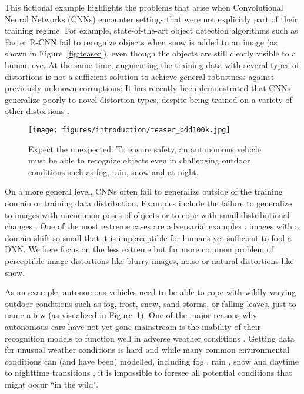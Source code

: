 \documentclass{article}
\begin{document}
\noindent
This fictional example highlights the problems that arise when Convolutional Neural Networks (CNNs) encounter settings that were not explicitly part of their training regime. For example, state-of-the-art object detection algorithms such as Faster R-CNN \citep{Ren2015} fail to recognize objects when snow is added to an image (as shown in Figure~\ref{fig:teaser}), even though the objects are still clearly visible to a human eye. At the same time, augmenting the training data with several types of distortions is not a sufficient solution to achieve general robustness against previously unknown corruptions: It has recently been demonstrated that CNNs generalize poorly to novel distortion types, despite being trained on a variety of other distortions \citep{Geirhos2018generalisation}. 

\begin{figure}[t]
    \centering
    \texttt{[image: figures/introduction/teaser\_bdd100k.jpg]}
    \caption{Expect the unexpected: To ensure safety, an autonomous vehicle must be able to recognize objects even in challenging outdoor conditions such as fog, rain, snow and at night.\protect\footnotemark}
    \label{fig:outdoor_hazards}
\end{figure}

On a more general level, CNNs often fail to generalize outside of the training domain or training data distribution. Examples include the failure to generalize to images with uncommon poses of objects \citep{alcorn2019strike} or to cope with small distributional changes \cite[e.g.][]{zech2018variable, touvron2019fixing}. One of the most extreme cases are adversarial examples \citep{szegedy2013intriguing}: images with a domain shift so small that it is imperceptible for humans yet sufficient to fool a DNN. We here focus on the less extreme but far more common problem of perceptible image distortions like blurry images, noise or natural distortions like snow.

As an example, autonomous vehicles need to be able to cope with wildly varying outdoor conditions such as fog, frost, snow, sand storms, or falling leaves, just to name a few (as visualized in Figure~\ref{fig:outdoor_hazards}). One of the major reasons why autonomous cars have not yet gone mainstream is the inability of their recognition models to function well in adverse weather conditions \citep{dai2018dark}. Getting data for unusual weather conditions is hard and while many common environmental conditions can (and have been) modelled, including fog \citep{Sakaridis18foggycityscapes}, rain \citep{hospach2016}, snow \citep{bernuth2019} and daytime to nighttime transitions \citep{dai2018dark}, it is impossible to foresee all potential conditions that might occur ``in the wild''.
\end{document}

